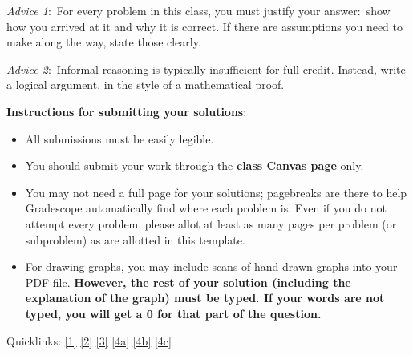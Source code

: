 \documentclass[12pt]{article}
\begin{document}
\renewcommand{\headrulewidth}{0.5pt}

\phantom{Test}

\begin{small}
\textit{Advice 1}:\ For every problem in this class, you must justify your answer:\ show how you arrived at it and why it is correct. If there are assumptions you need to make along the way, state those clearly.

\vspace{-3mm} 
\textit{Advice 2}:\ Informal reasoning is typically insufficient for full credit. Instead, write a logical argument, in the style of a mathematical proof.

\textbf{Instructions for submitting your solutions}:
\vspace{-5mm} 

\begin{itemize}
	\item All submissions must be easily legible.
	\item You should submit your work through the \href{https://canvas.colorado.edu/courses/59906}{\textbf{class Canvas page}} only.
	\item You may not need a full page for your solutions; pagebreaks are there to help Gradescope automatically find where each problem is. Even if you do not attempt every problem, please allot at least as many pages per problem (or subproblem) as are allotted in this template.
	\item For drawing graphs, you may include scans of hand-drawn graphs into your PDF file. \textbf{However, the rest of your solution (including the explanation of the graph) must be typed. If your words are not typed, you will get a 0 for that part of the question.}
\end{itemize}

Quicklinks: \ref{1} \ref{2} \ref{3} \ref{4a} \ref{4b} \ref{4c}
\vspace{-4mm} 
\end{small}


\hrulefill
\end{document}
